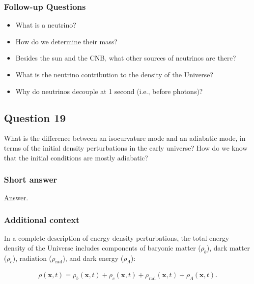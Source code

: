 \documentclass[a4paper,11pt]{article}
\begin{document}
\subsubsection{Follow-up Questions}

\begin{itemize}
    \item What is a neutrino?
    \item How do we determine their mass?
    \item Besides the sun and the CNB, what other sources of neutrinos are there?
    \item What is the neutrino contribution to the density of the Universe?
    \item Why do neutrinos decouple at 1 second (i.e., before photons)?
\end{itemize}


%
%

\newpage
\subsection{Question 19}

What is the difference between an isocurvature mode and an adiabatic mode, in terms of the initial density perturbations in the early universe? How do we know that the initial conditions are mostly adiabatic?

\subsubsection{Short answer}

Answer.

\subsubsection{Additional context}

In a complete description of energy density perturbations, the total energy density of the Universe includes components of baryonic matter ($\rho_b$), dark matter ($\rho_c$), radiation ($\rho_\mathrm{rad}$), and dark energy ($\rho_\Lambda$):

\begin{align*}
    \rho(\mathbf{x},t) = \rho_b(\mathbf{x},t) + \rho_c(\mathbf{x},t) + \rho_\mathrm{rad}(\mathbf{x},t) + \rho_\Lambda(\mathbf{x},t).
\end{align*}
\end{document}
